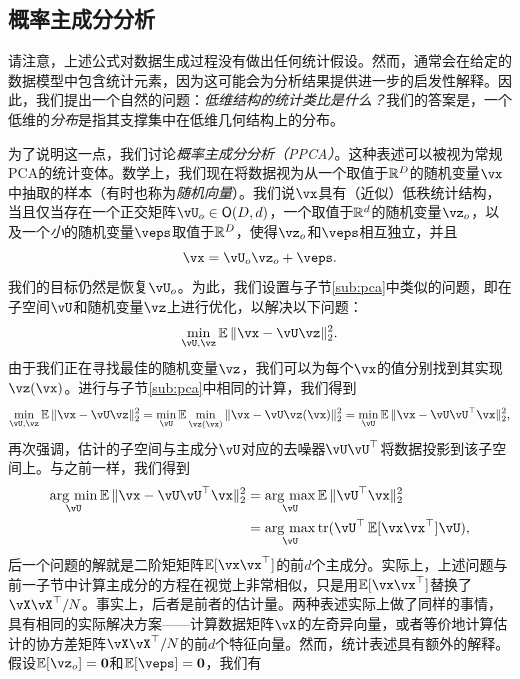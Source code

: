 \documentclass[../../book-main.tex]{subfiles}
\begin{document}
\subsection{概率主成分分析}

请注意，上述公式对数据生成过程没有做出任何统计假设。然而，通常会在给定的数据模型中包含统计元素，因为这可能会为分析结果提供进一步的启发性解释。因此，我们提出一个自然的问题：\textit{低维结构的统计类比是什么？}我们的答案是，一个低维的\textit{分布}是指其支撑集中在低维几何结构上的分布。

为了说明这一点，我们讨论\textit{概率主成分分析（PPCA）}。这种表述可以被视为常规PCA的统计变体。数学上，我们现在将数据视为从一个取值于\(\mathbb{R}^{D}\)的随机变量\(\vx\)中抽取的样本（有时也称为\textit{随机向量}）。我们说\(\vx\)具有（近似）低秩统计结构，当且仅当存在一个正交矩阵\(\vU_{o} \in \O(D, d)\)，一个取值于\(\mathbb{R}^{d}\)的随机变量\(\vz_{o}\)，以及一个\textit{小}的随机变量\(\veps\)取值于\(\mathbb{R}^{D}\)，使得\(\vz_{o}\)和\(\veps\)相互独立，并且
\begin{equation}
    \vx = \vU_{o}\vz_{o} + \veps.
\end{equation}
我们的目标仍然是恢复\(\vU_{o}\)。为此，我们设置与子节\eqref{sub:pca}中类似的问题，即在子空间\(\vU\)和随机变量\(\vz\)上进行优化，以解决以下问题：
\begin{equation}
    \min_{\vU, \vz}\Ex\norm{\vx - \vU\vz}_{2}^{2}.
\end{equation}
由于我们正在寻找最佳的随机变量\(\vz\)，我们可以为每个\(\vx\)的值分别找到其实现\(\vz(\vx)\)。进行与子节\eqref{sub:pca}中相同的计算，我们得到 %
\begin{equation}\label{eq:ppca_denoising}
    \min_{\vU, \vz}\Ex\norm{\vx - \vU\vz}_{2}^{2} = \min_{\vU}\Ex\min_{\vz(\vx)}\norm{\vx - \vU\vz(\vx)}_{2}^{2} = \min_{\vU}\Ex\norm{\vx - \vU\vU^{\top}\vx}_{2}^{2},
\end{equation}
再次强调，估计的子空间与主成分\(\vU\)对应的去噪器\(\vU\vU^{\top}\)将数据投影到该子空间上。与之前一样，我们得到
\begin{align}
    \argmin_{\vU}\Ex\norm{\vx - \vU\vU^{\top}\vx}_{2}^{2} 
    &= \argmax_{\vU}\Ex\norm{\vU^{\top}\vx}_{2}^{2} \\
    &= \argmax_{\vU}\tr(\vU^{\top}\Ex[\vx\vx^{\top}]\vU),
\end{align}
后一个问题的解就是二阶矩矩阵\(\Ex[\vx\vx^{\top}]\)的前\(d\)个主成分。实际上，上述问题与前一子节中计算主成分的方程在视觉上非常相似，只是用\(\Ex[\vx\vx^{\top}]\)替换了\(\vX\vX^{\top}/N\)。事实上，后者是前者的估计量。两种表述实际上做了同样的事情，具有相同的实际解决方案——计算数据矩阵\(\vX\)的左奇异向量，或者等价地计算估计的协方差矩阵\(\vX\vX^{\top}/N\)的前\(d\)个特征向量。然而，统计表述具有额外的解释。假设\(\Ex[\vz_{o}] = \vzero\)和\(\Ex[\veps] = \vzero\)，我们有
\end{document}
